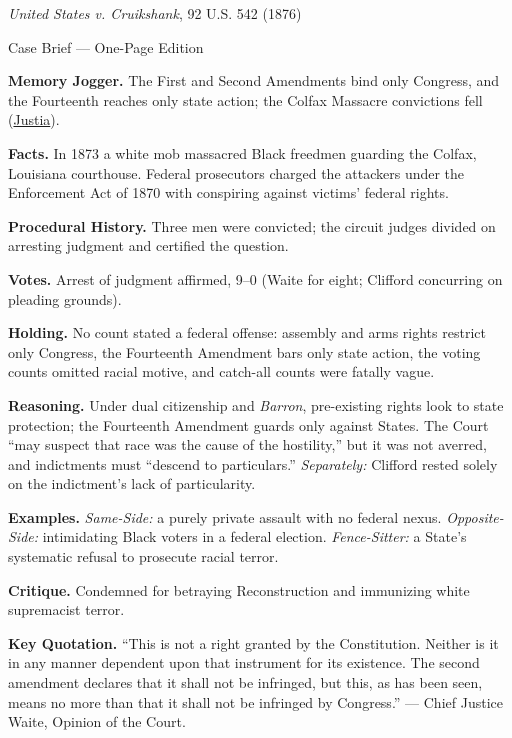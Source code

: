 \documentclass[12pt]{article}
\begin{document}
\begin{center}
{\Large \textit{United States v. Cruikshank}, 92 U.S. 542 (1876)\par}
\vspace{0.3em}
{\normalsize Case Brief --- One-Page Edition\par}
\end{center}

\textbf{Memory Jogger.} The First and Second Amendments bind only Congress, and the Fourteenth reaches only state action; the Colfax Massacre convictions fell (\href{https://supreme.justia.com/cases/federal/us/92/542/}{Justia}).

\textbf{Facts.} In 1873 a white mob massacred Black freedmen guarding the Colfax, Louisiana courthouse. Federal prosecutors charged the attackers under the Enforcement Act of 1870 with conspiring against victims' federal rights.

\textbf{Procedural History.} Three men were convicted; the circuit judges divided on arresting judgment and certified the question.

\textbf{Votes.} Arrest of judgment affirmed, 9--0 (Waite for eight; Clifford concurring on pleading grounds).

\textbf{Holding.} No count stated a federal offense: assembly and arms rights restrict only Congress, the Fourteenth Amendment bars only state action, the voting counts omitted racial motive, and catch-all counts were fatally vague.

\textbf{Reasoning.} Under dual citizenship and \textit{Barron}, pre-existing rights look to state protection; the Fourteenth Amendment guards only against States. The Court ``may suspect that race was the cause of the hostility,'' but it was not averred, and indictments must ``descend to particulars.'' \emph{Separately:} Clifford rested solely on the indictment's lack of particularity.

\textbf{Examples.} \emph{Same-Side:} a purely private assault with no federal nexus. \emph{Opposite-Side:} intimidating Black voters in a federal election. \emph{Fence-Sitter:} a State's systematic refusal to prosecute racial terror.

\textbf{Critique.} Condemned for betraying Reconstruction and immunizing white supremacist terror.

\textbf{Key Quotation.} ``This is not a right granted by the Constitution. Neither is it in any manner dependent upon that instrument for its existence. The second amendment declares that it shall not be infringed, but this, as has been seen, means no more than that it shall not be infringed by Congress.'' --- Chief Justice Waite, Opinion of the Court.
\end{document}
